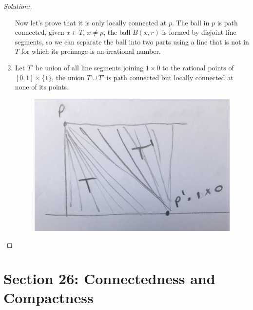 \documentclass[a4paper,12pt, reqno]{article}
\theoremstyle{definition}
\newenvironment{solution}{\begin{proof}[Solution:]}{\end{proof}}
\begin{document}
\begin{solution}
\begin{enumerate}[label=(\alph*)]
    Now let's prove that it is only locally connected at $p$. The ball in $p$ is path connected, given $x\in T$, $x\neq p$, the ball $B(x,r)$ is formed by disjoint line segments, so we can separate the ball into two parts using a line that is not in $T$ for which its preimage is an irrational number.
    \item Let $T'$ be union of all line segments joining $1\times 0$ to the rational points of $[0,1]\times\{ 1 \}$, the union $T\cup T'$ is path connected but locally connected at none of its points.
    \begin{figure}[H]
      \centering
      \includegraphics[scale=0.05]{Images/25-5-b.jpg}
    \end{figure}
  \end{enumerate}
\end{solution}

\section*{Section 26: Connectedness and Compactness}
\end{document}
